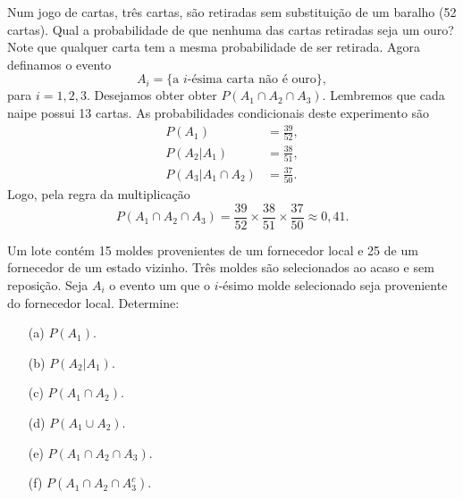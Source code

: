 \begin{frame}
\begin{exem}
	Num jogo de cartas, três cartas, são retiradas sem substituição de um baralho (52
	cartas). Qual a probabilidade de que nenhuma das cartas retiradas seja um ouro?
	Note que qualquer carta tem a mesma probabilidade de ser retirada. Agora definamos  o evento 
	$$A_i = \{ \text{a $i$-ésima carta não é ouro}\},$$ para $i = 1, 2, 3$. Desejamos obter 
	obter $P(A_1\cap  A_2 \cap A_3)$. Lembremos que cada naipe possui 13 cartas. 
	As probabilidades condicionais deste experimento são 
	$$
	\begin{aligned}
	P(A_1) &=\frac{39}{52}, \\
	P(A_2 | A_1) &= \frac{38}{51}, \\
	P(A_3 | A_1 \cap  A_2) &= \frac{37}{50}.
	\end{aligned}
	$$
	Logo, pela regra da multiplicação
	$$P(A_1 \cap A_2 \cap A_3) =\frac{39}{52}\times\frac{38}{51}\times\frac{37}{50} \approx 0,41.$$
\end{exem}

\end{frame}

\begin{frame}
\begin{exer}	
	Um lote contém 15 moldes provenientes de um fornecedor local e 25 de um fornecedor de um estado vizinho. Três moldes são selecionados ao acaso e sem reposição. Seja $A_i$ o evento um que o $i$-ésimo molde selecionado seja proveniente do fornecedor local. Determine:
	\begin{enumerate}
		\item[(a)] $P(A_1)$.
		\item[(b)] $P(A_2|A_1)$.
		\item[(c)] $P(A_1\cap A_2)$.
		\item[(d)] $P(A_1\cup A_2)$.
		\item[(e)] $P(A_1\cap A_2\cap A_3)$.
		\item[(f)] $P(A_1\cap A_2\cap A_3^c)$.
	\end{enumerate}
\end{exer}
\end{frame}


